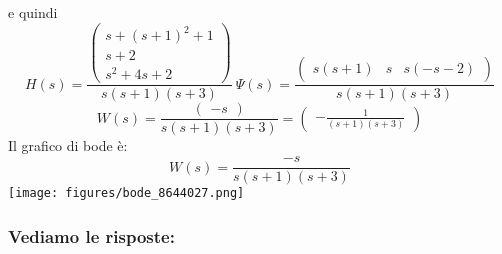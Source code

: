 \documentclass{article}
\begin{document}
e quindi \[ H(s)  =  \frac{\left(\begin{matrix}s + \left(s + 1\right)^{2} + 1\\s + 2\\s^{2} + 4 s + 2\end{matrix}\right)}{s \left(s + 1\right) \left(s + 3\right)} \ \Psi(s) = \frac{\left(\begin{matrix}s \left(s + 1\right) & s & s \left(- s - 2\right)\end{matrix}\right)}{s \left(s + 1\right) \left(s + 3\right)} \]
\[ W(s)  =  \frac{\left(\begin{matrix}- s\end{matrix}\right)}{s \left(s + 1\right) \left(s + 3\right)} = \left(\begin{matrix}- \frac{1}{\left(s + 1\right) \left(s + 3\right)}\end{matrix}\right)  \] 
Il grafico di bode è:
\[ W(s) = \frac{- s}{s \left(s + 1\right) \left(s + 3\right)} \]\texttt{[image: figures/bode\_8644027.png]}


\subsubsection{Vediamo le risposte:} 
\end{document}
